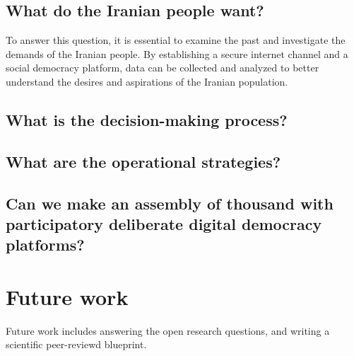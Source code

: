 \documentclass{IEEEtran}
\begin{document}
\subsection{What do the Iranian people want?}
To answer this question, it is essential to examine the past and investigate the demands of the Iranian people. By establishing a secure internet channel and a social democracy platform, data can be collected and analyzed to better understand the desires and aspirations of the Iranian population.
\subsection{What is the decision-making process?}


\subsection{What are the operational strategies?}

\subsection{Can we make an assembly of thousand with participatory deliberate digital democracy platforms?}




\section{Future work}
Future work includes answering the open research questions, and writing a scientific peer-reviewd blueprint.

\clearpage
\newpage


\printbibliography


% 
\end{document}
